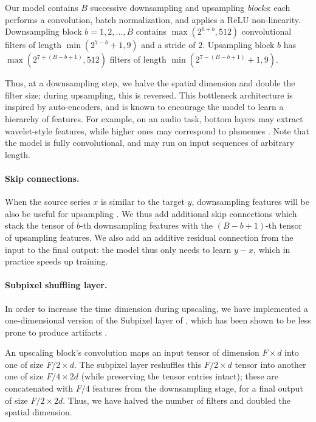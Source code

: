 \documentclass{article} \usepackage{iclr2017_workshop,times}
\begin{document}
Our model contains $B$ successive downsampling and upsampling {\em blocks}: each performs a convolution, batch normalization, and applies a ReLU non-linearity. Downsampling block $b=1,2,...,B$ contains $\max(2^{6+b}, 512)$ convolutional filters of length $\min(2^{7-b}+1, 9)$ and a stride of $2$. Upsampling block $b$ has $\max(2^{7+(B-b+1)}, 512)$ filters of length $\min(2^{7-(B-b+1)}+1, 9)$.

Thus, at a downsampling step, we halve the spatial dimension and double the filter size; during upsampling, this is reversed. This bottleneck architecture is inspired by auto-encoders, and is known to encourage the model to learn a hierarchy of features. For example, on an audio task, bottom layers may extract wavelet-style features, while higher ones may correspond to phonemes \cite{DBLP:conf/nips/AytarVT16}. Note that the model is fully convolutional, and may run on input sequences of arbitrary length.

\paragraph{Skip connections.}

When the source series $x$ is similar to the target $y$, downsampling features will be also be useful for upsampling \citep{pix2pix2016}. We thus add additional skip connections which stack the tensor of $b$-th downsampling features with the $(B-b+1)$-th tensor of upsampling features. We also add an additive residual connection from the input to the final output: the model thus only needs to learn $y-x$, which in practice speeds up training.

\paragraph{Subpixel shuffling layer.}

In order to increase the time dimension during upscaling, we have implemented a one-dimensional version of the Subpixel layer of \citet{ShiCHTABRW16}, which has been shown to be less prone to produce artifacts \citep{odena2016deconvolution}.

An upscaling block's convolution maps an input tensor of dimension $F \times d$ into one of size $F/2 \times d$.
The subpixel layer reshuffles this $F/2 \times d$ tensor into another one of size $F/4 \times 2d$ (while preserving the tensor entries intact); these are concatenated with $F/4$ features from the downsampling stage, for a final output of size $F/2 \times 2d$. Thus, we have halved the number of filters and doubled the spatial dimension.
\end{document}

